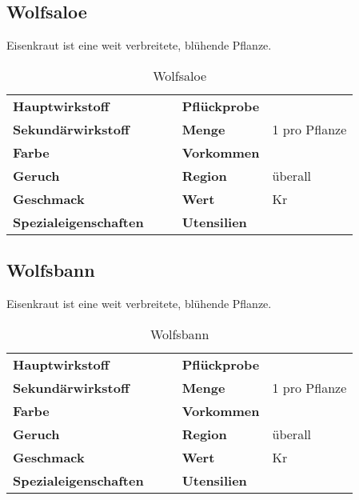\subsection{Wolfsaloe}
Eisenkraut ist eine weit verbreitete, blühende Pflanze. 

\begin{table}[h]
\begin{center}
\begin{tabular}{|l|l|p{1cm}|l|l|}
	\cline{1-2} \cline{4-5}
	\textbf{Hauptwirkstoff} &  && \textbf{Pflückprobe} &  \\ \cline{1-2} \cline{4-5}
	\textbf{Sekundärwirkstoff} &  && \textbf{Menge} & 1 pro Pflanze \\ \cline{1-2} \cline{4-5}
	\textbf{Farbe} &  && \textbf{Vorkommen} &  \\ \cline{1-2} \cline{4-5}
	\textbf{Geruch} &  && \textbf{Region} & überall \\ \cline{1-2} \cline{4-5}
	\textbf{Geschmack} &  && \textbf{Wert} & Kr \\ \cline{1-2} \cline{4-5}
	\textbf{Spezialeigenschaften} &  && \textbf{Utensilien} &  \\ \cline{1-2} \cline{4-5}
\end{tabular}
\end{center}
\caption{Wolfsaloe}
\label{tab:wolfsaloe}
\end{table}


\subsection{Wolfsbann}
Eisenkraut ist eine weit verbreitete, blühende Pflanze. 

\begin{table}[h]
\begin{center}
\begin{tabular}{|l|l|p{1cm}|l|l|}
	\cline{1-2} \cline{4-5}
	\textbf{Hauptwirkstoff} &  && \textbf{Pflückprobe} &  \\ \cline{1-2} \cline{4-5}
	\textbf{Sekundärwirkstoff} &  && \textbf{Menge} & 1 pro Pflanze \\ \cline{1-2} \cline{4-5}
	\textbf{Farbe} &  && \textbf{Vorkommen} &  \\ \cline{1-2} \cline{4-5}
	\textbf{Geruch} &  && \textbf{Region} & überall \\ \cline{1-2} \cline{4-5}
	\textbf{Geschmack} &  && \textbf{Wert} & Kr \\ \cline{1-2} \cline{4-5}
	\textbf{Spezialeigenschaften} &  && \textbf{Utensilien} &  \\ \cline{1-2} \cline{4-5}
\end{tabular}
\end{center}
\caption{Wolfsbann}
\label{tab:wolfsbann}
\end{table}


